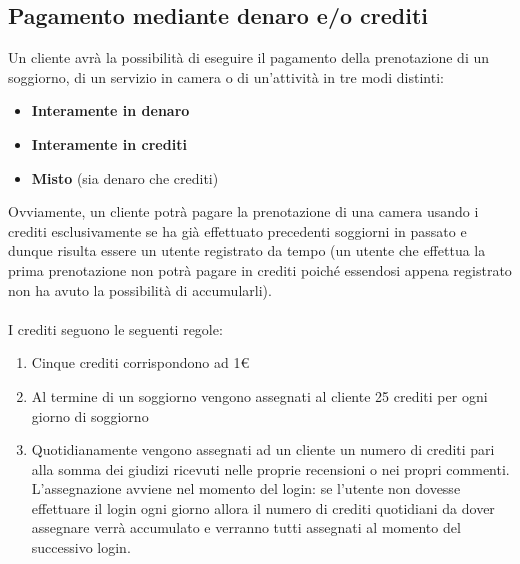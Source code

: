 \documentclass [a4paper, 12pt]{book}
\begin{document}
\subsection{Pagamento mediante denaro e/o crediti}
\label{Crediti}
Un cliente avrà la possibilità di eseguire il pagamento della prenotazione di un soggiorno, di un servizio in camera o di un'attività in tre modi distinti:
\begin{itemize}
\item \textbf{Interamente in denaro}
\item \textbf{Interamente in crediti}
\item \textbf{Misto} (sia denaro che crediti)
\end{itemize}
Ovviamente, un cliente potrà pagare la prenotazione di una camera usando i crediti esclusivamente se ha già effettuato precedenti soggiorni in passato e dunque risulta essere un utente registrato da tempo (un utente che effettua la prima prenotazione non potrà pagare in crediti poiché essendosi appena registrato non ha avuto la possibilità di accumularli).\\\\
I crediti seguono le seguenti regole: 
\begin{enumerate}
\item Cinque crediti corrispondono ad 1€
\item Al termine di un soggiorno vengono assegnati al cliente 25 crediti per ogni giorno di soggiorno
\item Quotidianamente vengono assegnati ad un cliente un numero di crediti pari alla somma dei giudizi ricevuti nelle proprie recensioni o nei propri commenti. L'assegnazione avviene nel momento del login: se l'utente non dovesse effettuare il login ogni giorno allora il numero di crediti quotidiani da dover assegnare verrà accumulato e verranno tutti assegnati al momento del successivo login.

\end{enumerate}

\medskip
\end{document}
